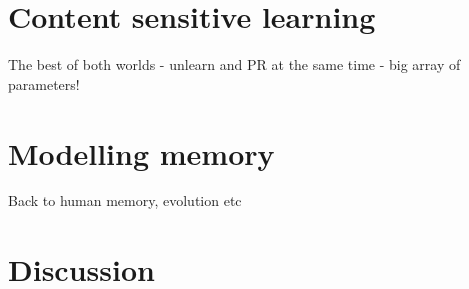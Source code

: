 \newpage{}%
\section{Content sensitive learning}
\label{sec:ContentLearn}

The best of both worlds - unlearn and PR at the same time - big array of parameters!


\newpage{}%
\section{Modelling memory}
\label{sec:Memory}

Back to human memory, evolution etc

\newpage{}%
\section{Discussion}
\label{sec:Discuss2}

